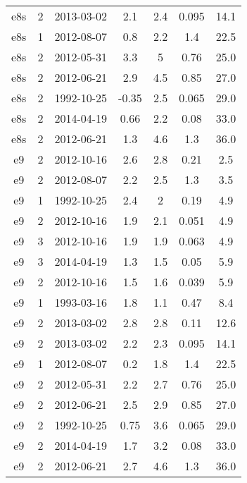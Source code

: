 \begin{table*}[htp]
\begin{tabular}{ccccccc}
e8s & 2 & 2013-03-02 & 2.1 & 2.4 & 0.095 & 14.1 \\
e8s & 1 & 2012-08-07 & 0.8 & 2.2 & 1.4 & 22.5 \\
e8s & 2 & 2012-05-31 & 3.3 & 5 & 0.76 & 25.0 \\
e8s & 2 & 2012-06-21 & 2.9 & 4.5 & 0.85 & 27.0 \\
e8s & 2 & 1992-10-25 & -0.35 & 2.5 & 0.065 & 29.0 \\
e8s & 2 & 2014-04-19 & 0.66 & 2.2 & 0.08 & 33.0 \\
e8s & 2 & 2012-06-21 & 1.3 & 4.6 & 1.3 & 36.0 \\
e9 & 2 & 2012-10-16 & 2.6 & 2.8 & 0.21 & 2.5 \\
e9 & 2 & 2012-08-07 & 2.2 & 2.5 & 1.3 & 3.5 \\
e9 & 1 & 1992-10-25 & 2.4 & 2 & 0.19 & 4.9 \\
e9 & 2 & 2012-10-16 & 1.9 & 2.1 & 0.051 & 4.9 \\
e9 & 3 & 2012-10-16 & 1.9 & 1.9 & 0.063 & 4.9 \\
e9 & 3 & 2014-04-19 & 1.3 & 1.5 & 0.05 & 5.9 \\
e9 & 2 & 2012-10-16 & 1.5 & 1.6 & 0.039 & 5.9 \\
e9 & 1 & 1993-03-16 & 1.8 & 1.1 & 0.47 & 8.4 \\
e9 & 2 & 2013-03-02 & 2.8 & 2.8 & 0.11 & 12.6 \\
e9 & 2 & 2013-03-02 & 2.2 & 2.3 & 0.095 & 14.1 \\
e9 & 1 & 2012-08-07 & 0.2 & 1.8 & 1.4 & 22.5 \\
e9 & 2 & 2012-05-31 & 2.2 & 2.7 & 0.76 & 25.0 \\
e9 & 2 & 2012-06-21 & 2.5 & 2.9 & 0.85 & 27.0 \\
e9 & 2 & 1992-10-25 & 0.75 & 3.6 & 0.065 & 29.0 \\
e9 & 2 & 2014-04-19 & 1.7 & 3.2 & 0.08 & 33.0 \\
e9 & 2 & 2012-06-21 & 2.7 & 4.6 & 1.3 & 36.0 \\
\hline
\end{tabular}

\end{table*}
